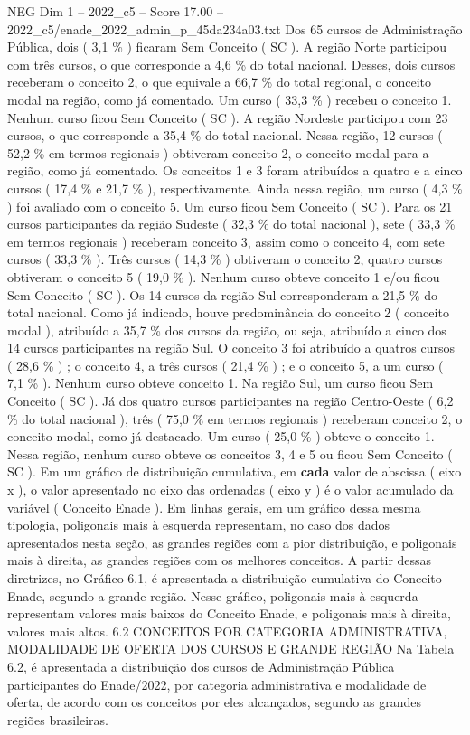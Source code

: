 \begin{textsample}{NEG Dim 1 – 2022\_c5 – Score 17.00 – 2022\_c5/enade\_2022\_admin\_p\_45da234a03.txt}
Dos 65 cursos de Administração Pública, dois ( 3,1 \% ) ficaram Sem Conceito ( SC ).
A região Norte participou com três cursos, o que corresponde a 4,6 \% do total nacional.
Desses, dois cursos receberam o conceito 2, o que equivale a 66,7 \% do total regional, o conceito modal na região, como já comentado.
Um curso ( 33,3 \% ) recebeu o conceito 1.
Nenhum curso ficou Sem Conceito ( SC ).
A região Nordeste participou com 23 cursos, o que corresponde a 35,4 \% do total nacional.
Nessa região, 12 cursos ( 52,2 \% em termos regionais ) obtiveram conceito 2, o conceito modal para a região, como já comentado.
Os conceitos 1 e 3 foram atribuídos a quatro e a cinco cursos ( 17,4 \% e 21,7 \% ), respectivamente.
Ainda nessa região, um curso ( 4,3 \% ) foi avaliado com o conceito 5.
Um curso ficou Sem Conceito ( SC ).
Para os 21 cursos participantes da região Sudeste ( 32,3 \% do total nacional ), sete ( 33,3 \% em termos regionais ) receberam conceito 3, assim como o conceito 4, com sete cursos ( 33,3 \% ).
Três cursos ( 14,3 \% ) obtiveram o conceito 2, quatro cursos obtiveram o conceito 5 ( 19,0 \% ).
Nenhum curso obteve conceito 1 e/ou ficou Sem Conceito ( SC ).
Os 14 cursos da região Sul corresponderam a 21,5 \% do total nacional.
Como já indicado, houve predominância do conceito 2 ( conceito modal ), atribuído a 35,7 \% dos cursos da região, ou seja, atribuído a cinco dos 14 cursos participantes na região Sul.
O conceito 3 foi atribuído a quatros cursos ( 28,6 \% ) ; o conceito 4, a três cursos ( 21,4 \% ) ; e o conceito 5, a um curso ( 7,1 \% ).
Nenhum curso obteve conceito 1.
Na região Sul, um curso ficou Sem Conceito ( SC ).
Já dos quatro cursos participantes na região Centro-Oeste ( 6,2 \% do total nacional ), três ( 75,0 \% em termos regionais ) receberam conceito 2, o conceito modal, como já destacado.
Um curso ( 25,0 \% ) obteve o conceito 1.
Nessa região, nenhum curso obteve os conceitos 3, 4 e 5 ou ficou Sem Conceito ( SC ).
Em um gráfico de distribuição cumulativa, em \textbf{cada} valor de abscissa ( eixo x ), o valor apresentado no eixo das ordenadas ( eixo y ) é o valor acumulado da variável ( Conceito Enade ).
Em linhas gerais, em um gráfico dessa mesma tipologia, poligonais mais à esquerda representam, no caso dos dados apresentados nesta seção, as grandes regiões com a pior distribuição, e poligonais mais à direita, as grandes regiões com os melhores conceitos.
A partir dessas diretrizes, no Gráfico 6.1, é apresentada a distribuição cumulativa do Conceito Enade, segundo a grande região.
Nesse gráfico, poligonais mais à esquerda representam valores mais baixos do Conceito Enade, e poligonais mais à direita, valores mais altos. 6.2 CONCEITOS POR CATEGORIA ADMINISTRATIVA, MODALIDADE DE OFERTA DOS CURSOS E GRANDE REGIÃO Na Tabela 6.2, é apresentada a distribuição dos cursos de Administração Pública participantes do Enade/2022, por categoria administrativa e modalidade de oferta, de acordo com os conceitos por eles alcançados, segundo as grandes regiões brasileiras.

\end{textsample}

